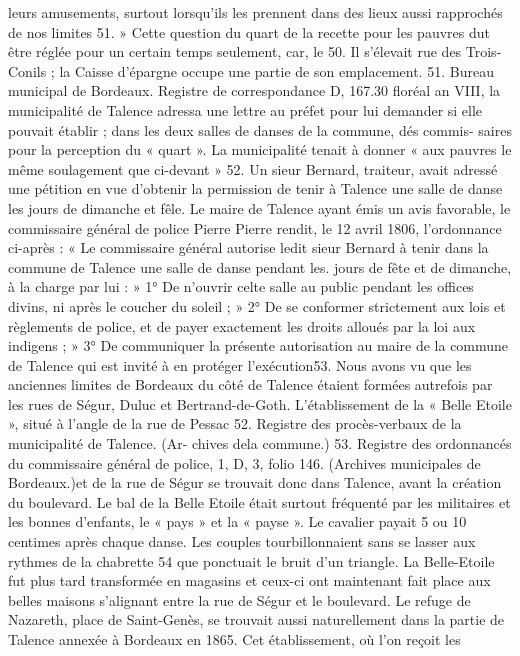 \documentclass[a4paper,11pt]{book}
\begin{document}
leurs amusements, surtout lorsqu'ils les prennent dans des
lieux aussi rapprochés de nos limites 51. »
Cette question du quart de la recette pour les pauvres
dut être réglée pour un certain temps seulement, car, le
50. Il s'élevait rue des Trois-Conils ; la Caisse d'épargne occupe une
partie de son emplacement.
51. Bureau municipal de Bordeaux. Registre de correspondance D,
167.30 floréal an VIII, la municipalité de Talence adressa une
lettre au préfet pour lui demander si elle pouvait établir ;
dans les deux salles de danses de la commune, dés commis-
saires pour la perception du « quart ». La municipalité
tenait à donner « aux pauvres le même soulagement que
ci-devant » 52.
Un sieur Bernard, traiteur, avait adressé une pétition
en vue d'obtenir la permission de tenir à Talence une salle
de danse les jours de dimanche et fêle. Le maire de Talence
ayant émis un avis favorable, le commissaire général de
police Pierre Pierre rendit, le 12 avril 1806, l'ordonnance
ci-après :
« Le commissaire général autorise ledit sieur Bernard
à tenir dans la commune de Talence une salle de danse
pendant les. jours de fête et de dimanche, à la charge par
lui :
» 1° De n'ouvrir celte salle au public pendant les offices
divins, ni après le coucher du soleil ;
» 2° De se conformer strictement aux lois et règlements
de police, et de payer exactement les droits alloués par la
loi aux indigens ;
» 3° De communiquer la présente autorisation au maire
de la commune de Talence qui est invité à en protéger
l'exécution53.
Nous avons vu que les anciennes limites de Bordeaux
du côté de Talence étaient formées autrefois par les rues
de Ségur, Duluc et Bertrand-de-Goth. L'établissement de
la « Belle Etoile », situé à l'angle de la rue de Pessac
52. Registre des procès-verbaux de la municipalité de Talence. (Ar-
chives dela commune.)
53. Registre des ordonnancés du commissaire général de police, 1,
D, 3, folio 146. (Archives municipales de Bordeaux.)et de la rue de Ségur se trouvait donc dans Talence, avant
la création du boulevard.
Le bal de la Belle Etoile était surtout fréquenté par
les militaires et les bonnes d'enfants, le « pays » et la
« payse ». Le cavalier payait 5 ou 10 centimes après chaque
danse. Les couples tourbillonnaient sans se lasser aux
rythmes de la chabrette 54 que ponctuait le bruit d'un
triangle.
La Belle-Etoile fut plus tard transformée en magasins
et ceux-ci ont maintenant fait place aux belles maisons
s'alignant entre la rue de Ségur et le boulevard.
Le refuge de Nazareth, place de Saint-Genès, se trouvait
aussi naturellement dans la partie de Talence annexée à
Bordeaux en 1865. Cet établissement, où l'on reçoit les
\end{document}
